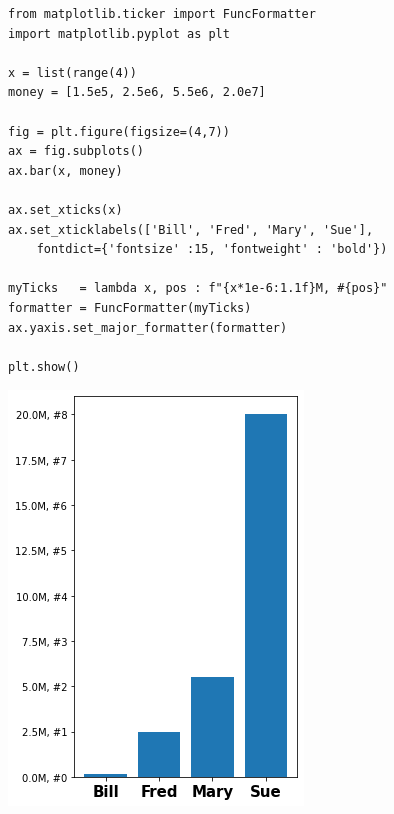 \begin{frame}[fragile]
%
\begin{codebox}[Example: Tickmarks, width=.65\linewidth, nobeforeafter, equal height group = grpXmpFormatter]
\begin{verbatim}
from matplotlib.ticker import FuncFormatter
import matplotlib.pyplot as plt

x = list(range(4))
money = [1.5e5, 2.5e6, 5.5e6, 2.0e7]

fig = plt.figure(figsize=(4,7))
ax = fig.subplots()
ax.bar(x, money)

ax.set_xticks(x)
ax.set_xticklabels(['Bill', 'Fred', 'Mary', 'Sue'],
    fontdict={'fontsize' :15, 'fontweight' : 'bold'})

myTicks   = lambda x, pos : f"{x*1e-6:1.1f}M, #{pos}"
formatter = FuncFormatter(myTicks)
ax.yaxis.set_major_formatter(formatter)

plt.show()
\end{verbatim}
\end{codebox}
%
\begin{tcolorbox}[title=Output: Tickmarks, width=.32\linewidth, nobeforeafter, equal height group = grpXmpFormatter]
	\hspace{-13pt}
	\includegraphics[width=1.22\linewidth]{./gfx/plt-TicksFormatter}
\end{tcolorbox}
%
\end{frame}


